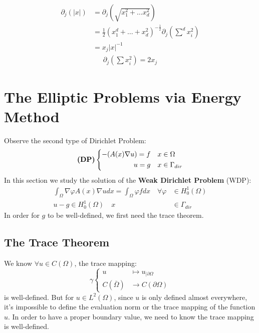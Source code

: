 \documentclass[a4paper,11pt,oneside,fleqn]{book}
\theoremstyle{definition}
\theoremstyle{remark}
\let\div\relax
\DeclareMathOperator{\div}{div}
\begin{document}
\begin{align*}
	\partial_j(|x|) &= \partial_j (\sqrt{x_1^2 + \dots x_d^2})\\
	&=\frac{1}{2} (x_1^d + \dots + x_d^2)^{-\frac{1}{2}} \partial_j (\sum^d x_i^2)\\
	&= x_j |x|^{-1}
\end{align*}
\begin{align*}
	\partial_j(\sum x_i^2) = 2x_j
\end{align*}












\newpage
\section{The Elliptic Problems via Energy Method}
Observe the second type of Dirichlet Problem:
\begin{equation}\label{PE:DP(2)}
\textbf{(DP)} \left\{
\begin{aligned}
	-\div(A(x) \nabla u) = f \quad x &\in \Omega\\
	u = g \quad x &\in \Gamma_{dir}
\end{aligned}
\right.	
\end{equation}
In this section we study the solution of the \textbf{Weak Dirichlet Problem} (WDP):
\begin{equation}
\begin{aligned}
	\int_\Omega \nabla \varphi A(x) \nabla u dx = \int_\Omega \varphi f dx
	\quad \forall \varphi &\in H^1_0(\Omega)\\
	 u - g \in H^1_0(\Omega) \quad x &\in \Gamma_{dir}
\end{aligned}	
\end{equation}
In order for $g$ to be well-defined, we first need the trace theorem. 


\subsection{The Trace Theorem}
We know $\forall u \in C(\Omega)$, the trace mapping:
\begin{equation*}
\gamma\left\{
\begin{aligned}
	u &\mapsto u_{|\partial \Omega}\\
	C(\bar{\Omega}) &\rightarrow C(\partial \Omega)
\end{aligned}
\right.	
\end{equation*}
is well-defined. But for $u \in L^2(\Omega)$, since $u$ is only defined almost everywhere, it's impossible to define the evaluation norm or the trace mapping of the function $u$. In order to have a proper boundary value, we need to know the trace mapping is well-defined.
\end{document}
